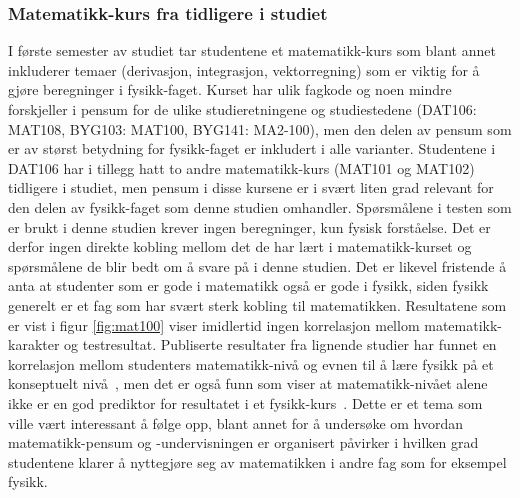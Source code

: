 \documentclass[a4paper,norsk,12pt]{article}
\begin{document}
\subsubsection{Matematikk-kurs fra tidligere i studiet}
I første semester av studiet tar studentene et matematikk-kurs som blant annet inkluderer temaer (derivasjon, integrasjon, vektorregning) som er viktig for å gjøre beregninger i fysikk-faget. Kurset har ulik fagkode og noen mindre forskjeller i pensum for de ulike studieretningene og studiestedene (DAT106: MAT108, BYG103: MAT100, BYG141: MA2-100), men den delen av pensum som er av størst betydning for fysikk-faget er inkludert i alle varianter. Studentene i DAT106 har i tillegg hatt to andre matematikk-kurs (MAT101 og MAT102) tidligere i studiet, men pensum i disse kursene er i svært liten grad relevant for den delen av fysikk-faget som denne studien omhandler. Spørsmålene i testen som er brukt i denne studien krever ingen beregninger, kun fysisk forståelse. Det er derfor ingen direkte kobling mellom det de har lært i matematikk-kurset og spørsmålene de blir bedt om å svare på i denne studien. Det er likevel fristende å anta at studenter som er gode i matematikk også er gode i fysikk, siden fysikk generelt er et fag som har svært sterk kobling til matematikken. Resultatene som er vist i figur \ref{fig:mat100} viser imidlertid ingen korrelasjon mellom matematikk-karakter og testresultat. Publiserte resultater fra lignende studier har funnet en korrelasjon mellom studenters matematikk-nivå og evnen til å lære fysikk på et konseptuelt nivå~\cite{5c27a2a258c342bc822a508f17d2b0da}, men det er også funn som viser at matematikk-nivået alene ikke er en god prediktor for resultatet i et fysikk-kurs~\cite{VINITSKYPINSKY2014611}. Dette er et tema som ville vært interessant å følge opp, blant annet for å undersøke om hvordan matematikk-pensum og -undervisningen er organisert påvirker i hvilken grad studentene klarer  å nyttegjøre seg av matematikken i andre fag som for eksempel fysikk.
\end{document}
